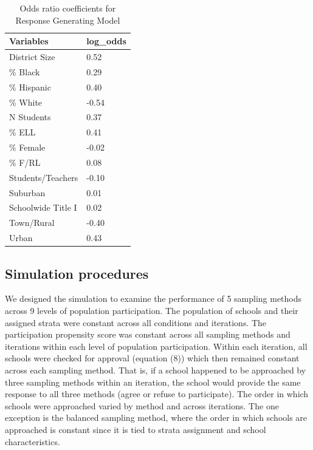 \documentclass[
  english,
  man,floatsintext]{apa6}
\begin{document}
\begin{table}[tbp]

\begin{center}
\begin{threeparttable}

\caption{\label{tab:tab-RGM-Pars}Odds ratio coefficients for Response Generating Model}

\begin{tabular}{ll}
\toprule
Variables & \multicolumn{1}{c}{log\_odds}\\
\midrule
District Size & 0.52\\
\% Black & 0.29\\
\% Hispanic & 0.40\\
\% White & -0.54\\
N Students & 0.37\\
\% ELL & 0.41\\
\% Female & -0.02\\
\% F/RL & 0.08\\
Students/Teachers & -0.10\\
Suburban & 0.01\\
Schoolwide Title I & 0.02\\
Town/Rural & -0.40\\
Urban & 0.43\\
\bottomrule
\end{tabular}

\end{threeparttable}
\end{center}

\end{table}



\hypertarget{simulation-procedures}{%
\subsection{Simulation procedures}\label{simulation-procedures}}

We designed the simulation to examine the performance of 5 sampling methods across 9 levels of population participation. The population of schools and their assigned strata were constant across all conditions and iterations. The participation propensity score was constant across all sampling methods and iterations within each level of population participation. Within each iteration, all schools were checked for approval (equation (8)) which then remained constant across each sampling method. That is, if a school happened to be approached by three sampling methods within an iteration, the school would provide the same response to all three methods (agree or refuse to participate). The order in which schools were approached varied by method and across iterations. The one exception is the balanced sampling method, where the order in which schools are approached is constant since it is tied to strata assignment and school characteristics.
\end{document}
